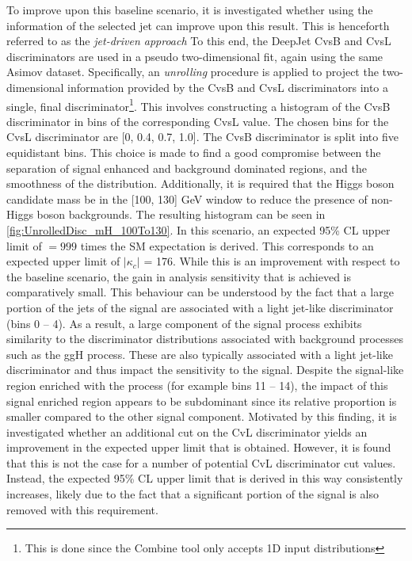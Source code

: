 To improve upon this baseline scenario, it is investigated whether using the information of the selected jet can improve upon this result. This is henceforth referred to as the \textit{jet-driven approach} To this end, the \textsf{DeepJet} CvsB and CvsL discriminators are used in a pseudo two-dimensional fit, again using the same Asimov dataset. Specifically, an \textit{unrolling} procedure is applied to project the two-dimensional information provided by the CvsB and CvsL discriminators into a single, final discriminator\footnote{This is done since the \textsf{Combine} tool only accepts 1D input distributions}. This involves constructing a histogram of the CvsB discriminator in bins of the corresponding CvsL value. The chosen bins for the CvsL discriminator are [0, 0.4, 0.7, 1.0]. The CvsB discriminator is split into five equidistant bins. This choice is made to find a good compromise between the separation of signal enhanced and background dominated regions, and the smoothness of the distribution. Additionally, it is required that the Higgs boson candidate mass be in the [100, 130] GeV window to reduce the presence of non-Higgs boson backgrounds. The resulting histogram can be seen in \autoref{fig:UnrolledDisc_mH_100To130}. In this scenario, an expected 95\% CL upper limit of \sBR$ = 999$ times the SM expectation is derived. This corresponds to an expected upper limit of $\mid$$\kappa_c$$\mid$ = 176. While this is an improvement with respect to the baseline scenario, the gain in analysis sensitivity that is achieved is comparatively small. This behaviour can be understood by the fact that a large portion of the jets of the \cHZZsen signal are associated with a light jet-like discriminator (bins 0 -- 4). As a result, a large component of the signal process exhibits similarity to the discriminator distributions associated with background processes such as the ggH process. These are also typically associated with a light jet-like discriminator and thus impact the sensitivity to the signal. Despite the signal-like region enriched with the \cHZZsen process (for example bins 11 -- 14), the impact of this signal enriched region appears to be subdominant since its relative proportion is smaller compared to the other signal component. Motivated by this finding, it is investigated whether an additional cut on the CvL discriminator yields an improvement in the expected upper limit that is obtained. However, it is found that this is not the case for a number of potential CvL discriminator cut values. Instead, the expected 95\% CL upper limit that is derived in this way consistently increases, likely due to the fact that a significant portion of the signal is also removed with this requirement. \\
